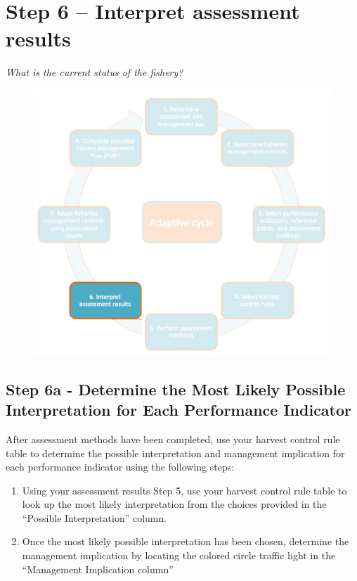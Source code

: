 \documentclass[]{book}
\begin{document}
\chapter{Step 6 -- Interpret assessment results}\label{Step6}

\emph{What is the current status of the fishery?}

\begin{figure}
\centering
\includegraphics{myMediaFolder/media/Step6.png}
\caption{}
\end{figure}

\section{Step 6a - Determine the Most Likely Possible Interpretation for
Each Performance
Indicator}\label{step-6a---determine-the-most-likely-possible-interpretation-for-each-performance-indicator}

After assessment methods have been completed, use your harvest control
rule table to determine the possible interpretation and management
implication for each performance indicator using the following steps:

\begin{enumerate}
\def\labelenumi{\alph{enumi})}
\item
  Using your assessment results Step 5, use your harvest control rule
  table to look up the most likely interpretation from the choices
  provided in the ``Possible Interpretation'' column.
\item
  Once the most likely possible interpretation has been chosen,
  determine the management implication by locating the colored circle
  traffic light in the ``Management Implication column''
\end{enumerate}
\end{document}
